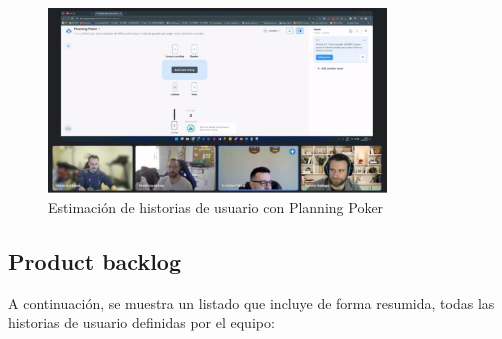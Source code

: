 \begin{figure}[H]
    \centering
    \includegraphics[width=0.8\textwidth]{../imagenes/secciones/4-Ingenieria-de-requerimientos/Poker Planning.jpg}
    \caption{Estimación de historias de usuario con Planning Poker}
    \label{fig:estimacionPokerPlanning}
\end{figure}


\subsection{Product backlog}

A continuación, se muestra un listado que incluye de forma resumida, todas las historias de usuario definidas por el equipo: